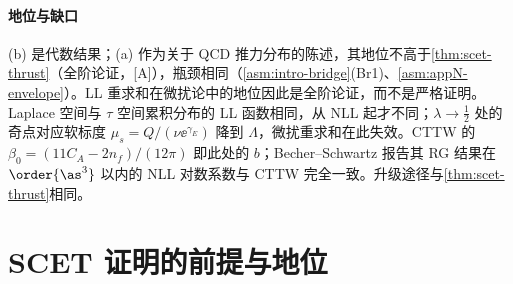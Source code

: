 \paragraph{地位与缺口}
(b) 是代数结果；(a) 作为关于 QCD 推力分布的陈述，其地位不高于\cref{thm:scet-thrust}（全阶论证，[A]），瓶颈相同（\cref{asm:intro-bridge}(Br1)、\cref{asm:appN-envelope}）。LL 重求和在微扰论中的地位因此是全阶论证，而不是严格证明。Laplace 空间与 $\tau$ 空间累积分布的 LL 函数相同，从 NLL 起才不同；$\lambda\to\frac12$ 处的奇点对应软标度 $\mu_s=Q/(\nu\ee^{\gamma_E})$ 降到 $\Lambda$，微扰重求和在此失效。CTTW 的 $\beta_0=(11C_A-2n_f)/(12\pi)$ 即此处的 $b$；Becher--Schwartz 报告其 RG 结果在 $\order{\as^3}$ 以内的 NLL 对数系数与 CTTW 完全一致\cite[附录~C]{BecherSchwartz2008}。升级途径与\cref{thm:scet-thrust}相同。

\section{SCET 证明的前提与地位}\label{sec:scet-status}

